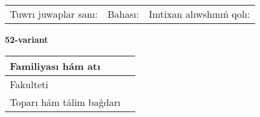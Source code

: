 \documentclass{article}
\begin{document}
\vspace{1cm}

\begin{tabular}{lll}
Tuwrı juwaplar sanı: \underline{\hspace{1.5cm}} & 
Bahası: \underline{\hspace{1.5cm}} & 
Imtixan alıwshınıń qolı: \underline{\hspace{2cm}} \\
\end{tabular}

\egroup

\newpage


\textbf{52-variant}\\

\bgroup
\def\arraystretch{1.6} %

\begin{tabular}{|m{5.7cm}|m{9.5cm}|}
\hline
Familiyası hám atı & \\
\hline
Fakulteti  & \\
\hline
Toparı hám tálim baǵdarı  & \\
\hline
\end{tabular}

\vspace{1cm}
\end{document}
